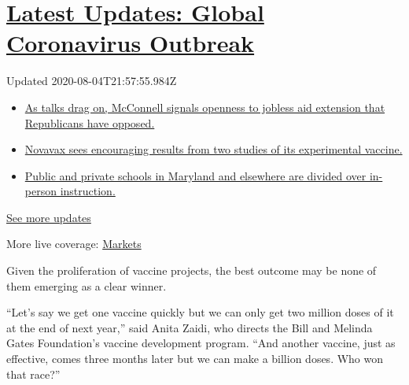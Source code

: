 \hypertarget{latest-updates-global-coronavirus-outbreak}{%
\section{\texorpdfstring{\href{https://www.nytimes3xbfgragh.onion/2020/08/04/world/coronavirus-cases.html?action=click\&pgtype=Article\&state=default\&region=MAIN_CONTENT_1\&context=storylines_live_updates}{Latest
Updates: Global Coronavirus
Outbreak}}{Latest Updates: Global Coronavirus Outbreak}}\label{latest-updates-global-coronavirus-outbreak}}

Updated 2020-08-04T21:57:55.984Z

\begin{itemize}
\tightlist
\item
  \href{https://www.nytimes3xbfgragh.onion/2020/08/04/world/coronavirus-cases.html?action=click\&pgtype=Article\&state=default\&region=MAIN_CONTENT_1\&context=storylines_live_updates\#link-2daa96b5}{As
  talks drag on, McConnell signals openness to jobless aid extension
  that Republicans have opposed.}
\item
  \href{https://www.nytimes3xbfgragh.onion/2020/08/04/world/coronavirus-cases.html?action=click\&pgtype=Article\&state=default\&region=MAIN_CONTENT_1\&context=storylines_live_updates\#link-1228a480}{Novavax
  sees encouraging results from two studies of its experimental
  vaccine.}
\item
  \href{https://www.nytimes3xbfgragh.onion/2020/08/04/world/coronavirus-cases.html?action=click\&pgtype=Article\&state=default\&region=MAIN_CONTENT_1\&context=storylines_live_updates\#link-4825b93}{Public
  and private schools in Maryland and elsewhere are divided over
  in-person instruction.}
\end{itemize}

\href{https://www.nytimes3xbfgragh.onion/2020/08/04/world/coronavirus-cases.html?action=click\&pgtype=Article\&state=default\&region=MAIN_CONTENT_1\&context=storylines_live_updates}{See
more updates}

More live coverage:
\href{https://www.nytimes3xbfgragh.onion/live/2020/08/04/business/stock-market-today-coronavirus?action=click\&pgtype=Article\&state=default\&region=MAIN_CONTENT_1\&context=storylines_live_updates}{Markets}

Given the proliferation of vaccine projects, the best outcome may be
none of them emerging as a clear winner.

``Let's say we get one vaccine quickly but we can only get two million
doses of it at the end of next year,'' said Anita Zaidi, who directs the
Bill and Melinda Gates Foundation's vaccine development program. ``And
another vaccine, just as effective, comes three months later but we can
make a billion doses. Who won that race?''

